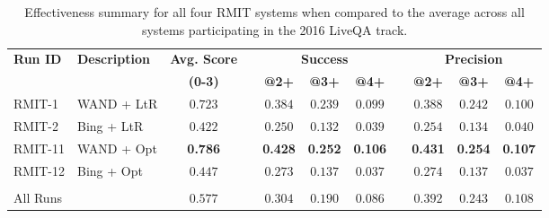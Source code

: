 \begin{table*}[!t]
\centering
\caption{
Effectiveness summary for all four RMIT systems when compared to the
average across all systems participating in the 2016 LiveQA track.
\label{tab:runs}}
\begin{tabular}{llccccccccc}
\toprule
\multirow{2}{*}{\bf Run ID} & {\bf Description} & {\bf Avg. Score} && \multicolumn{3}{c}{\bf Success} && \multicolumn{3}{c}{\bf Precision} \\
& & {\bf (0-3)} && {\bf @2+} & {\bf @3+} & {\bf @4+} && {\bf @2+} & {\bf @3+} & {\bf @4+} \\
\midrule
RMIT-1  & WAND + LtR & $0.723$     && $0.384$ & $0.239$ & $0.099$ && $0.388$ & $0.242$ & $0.100$ \\
RMIT-2  & Bing + LtR & $0.422$     && $0.250$ & $0.132$ & $0.039$ && $0.254$ & $0.134$ & $0.040$ \\
RMIT-11 & WAND + Opt & {\bf 0.786} && {\bf 0.428} & {\bf 0.252} & {\bf 0.106} && {\bf 0.431} & {\bf 0.254} & {\bf 0.107} \\
RMIT-12 & Bing + Opt & $0.447$     && $0.273$ & $0.137$ & $0.037$ && $0.274$ & $0.137$ & $0.037$ \\
&&&&&&&&&\\
All Runs  & &$0.577$&&$0.304$&$0.190$&$0.086$&&$0.392$&$0.243$&$0.108$\\
\bottomrule
\end{tabular}
\end{table*}

